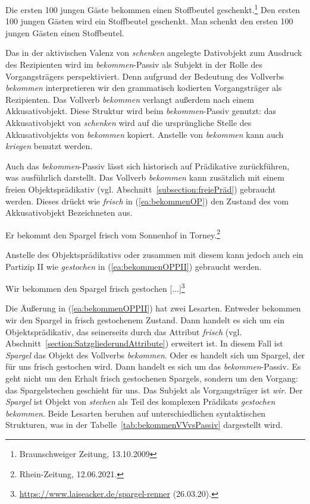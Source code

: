 \ea \label{ea:bekommenPassiv1} 
\ea \label{ea:geschenktbekommen} Die ersten 100 jungen Gäste bekommen einen Stoffbeutel geschenkt.\footnote{Braunschweiger Zeitung, 13.10.2009} 
\ex \label{ex:geschenktwerden} Den ersten 100 jungen Gästen wird ein Stoffbeutel geschenkt.
\ex \label{ex:schenkenAkt} Man schenkt den ersten 100 jungen Gästen einen Stoffbeutel.
\z 
\z 

Das in der aktivischen Valenz von \textit{schenken} angelegte Dativobjekt zum Ausdruck des Rezipienten wird im \textit{bekommen}-Passiv als Subjekt in der Rolle des Vorgangsträgers perspektiviert. Denn aufgrund der Bedeutung des Vollverbs \textit{bekommen} interpretieren wir den grammatisch kodierten Vorgangsträger als Rezipienten. Das Vollverb \textit{bekommen} verlangt außerdem nach einem Akkusativobjekt. Diese Struktur wird beim \textit{bekommen}-Passiv genutzt: das Akkusativobjekt von \textit{schenken} wird auf die ursprüngliche Stelle des Akkusativobjekts von \textit{bekommen} kopiert. Anstelle von \textit{bekommen} kann auch \textit{kriegen} benutzt werden.

Auch das \textit{bekommen}-Passiv lässt sich historisch auf Prädikative zurückführen, was \citet[13--21]{Leirbukt1997} ausführlich darstellt. Das Vollverb \textit{bekommen} kann zusätzlich mit einem freien Objektsprädikativ (vgl. Abschnitt~\ref{subsection:freiePräd}) gebraucht werden. Dieses drückt wie \textit{frisch} in (\ref{ea:bekommenOP}) den Zustand des vom Akkusativobjekt Bezeichneten aus.

\ea \label{ea:bekommenOP} Er bekommt den Spargel frisch vom Sonnenhof in Torney.\footnote{Rhein-Zeitung, 12.06.2021.}
\z 

Anstelle des Objektsprädikativs oder zusammen mit diesem kann jedoch auch ein Partizip II wie \textit{gestochen} in (\ref{ea:bekommenOPPII}) gebraucht werden.

\ea \label{ea:bekommenOPPII} Wir bekommen den Spargel frisch gestochen [...]\footnote{\url{https://www.laiseacker.de/spargel-renner} (26.03.20).}
\z 

Die Äußerung in (\ref{ea:bekommenOPPII}) hat zwei Lesarten. Entweder bekommen wir den Spargel in frisch gestochenem Zustand. Dann handelt es sich um ein Objektsprädikativ, das seinerseits durch das Attribut \textit{frisch} (vgl. Abschnitt~\ref{section:SatzgliederundAttribute}) erweitert ist. In diesem Fall ist \textit{Spargel} das Objekt des Vollverbs \textit{bekommen}. Oder es handelt sich um Spargel, der für uns frisch gestochen wird. Dann handelt es sich um das \textit{bekommen}-Passiv. Es geht nicht um den Erhalt frisch gestochenen Spargels, sondern um den Vorgang: das Spargelstechen geschieht für uns. Das Subjekt als Vorgangsträger ist \textit{wir}. Der \textit{Spargel} ist Objekt von \textit{stechen} als Teil des komplexen Prädikats \textit{gestochen bekommen}. Beide Lesarten beruhen auf unterschiedlichen syntaktischen Strukturen, was in der Tabelle~\ref{tab:bekommenVVvsPassiv} dargestellt wird.

